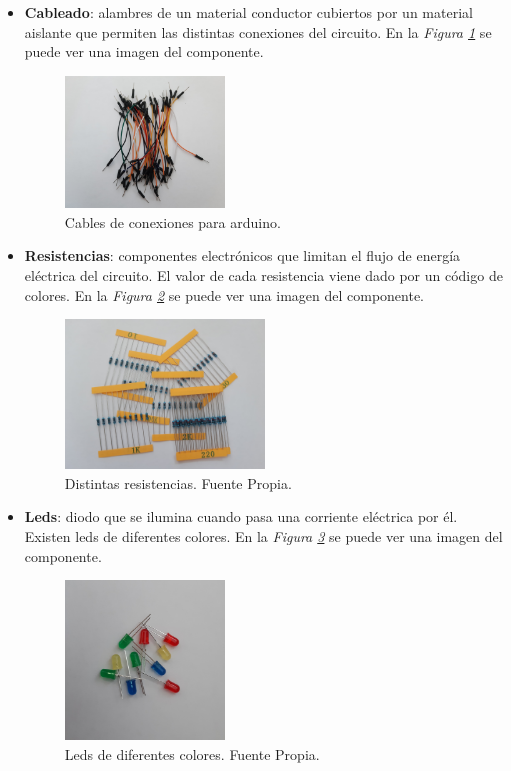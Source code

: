 \begin{itemize}
\item \textbf{Cableado}: alambres de un material conductor cubiertos por un material aislante que permiten las distintas conexiones del circuito. En la \textit{Figura \ref{fig:cableado}} se puede ver una imagen del componente.
\begin{figure}[h!]
    \centering
    \includegraphics[width=0.4\textwidth]{img/imgCableado.JPG}
    \caption{Cables de conexiones para arduino.}
    \label{fig:cableado}
\end{figure}

\item \textbf{Resistencias}: componentes electrónicos que limitan el flujo de energía eléctrica del circuito. El valor de cada resistencia viene dado por un código de colores. En la \textit{Figura \ref{fig:resistencias}} se puede ver una imagen del componente.
\begin{figure}[h!]
    \centering
    \includegraphics[width=0.5\textwidth]{img/imgResistencias.JPG}
    \caption{Distintas resistencias. Fuente Propia.}
    \label{fig:resistencias} 
\end{figure}

\item \textbf{Leds}: diodo que se ilumina cuando pasa una corriente eléctrica por él. Existen leds de diferentes colores. En la \textit{Figura \ref{fig:leds}} se puede ver una imagen del componente.
\begin{figure}[h!]
    \centering
    \includegraphics[width=0.4\textwidth]{img/imgLeds.JPG}
    \caption{Leds de diferentes colores. Fuente Propia.}
    \label{fig:leds} 
\end{figure}


\end{itemize}
